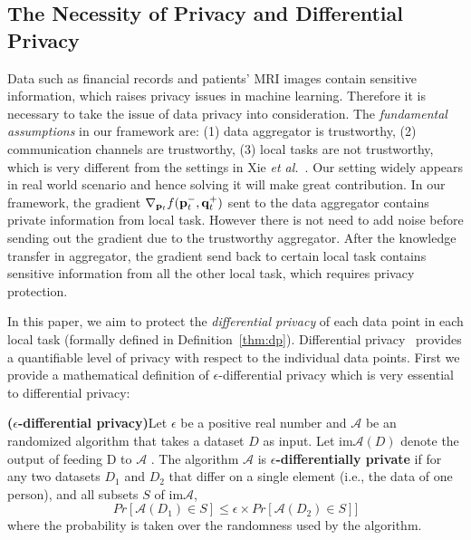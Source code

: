 \subsection{The Necessity of Privacy and Differential Privacy}
\label{Necessity}

Data such as financial records and patients' MRI images contain sensitive information, which raises privacy issues in machine learning. Therefore it is necessary to take the issue of data privacy into consideration. The \textit{fundamental assumptions} in our framework are: (1) data aggregator is trustworthy, (2) communication channels are trustworthy, (3) local tasks are not trustworthy, which is very different from the settings in Xie {\it et al.}~\cite{xie2017privacy}. Our setting widely appears in real world scenario and hence solving it will make great contribution. In our framework, the gradient $\nabla_{\mathbf{p}_t}f(\mathbf{p}_t^-, \mathbf{q}_t^+)$ sent to the data aggregator contains private information from local task. However there is not need to add noise before sending out the gradient due to the trustworthy aggregator. After the knowledge transfer in aggregator, the gradient send back to certain local task contains sensitive information from all the other local task, which requires privacy protection. 

In this paper, we aim to protect the \textit{differential privacy} of
each data point in each local task (formally defined in
Definition~\ref{thm:dp}). Differential privacy~\cite{dwork2006differential}
provides a quantifiable level of privacy with respect to the individual data
points. First we provide a mathematical definition of $\epsilon$-differential privacy which is very essential to differential privacy:

\begin{theorem}
\textbf{($\epsilon$-differential privacy\cite{Dwork:2014:AFD:2693052.2693053})}\indent Let $\epsilon$  be a positive real number and $\mathcal{A}$ be an randomized algorithm that takes a dataset $D$ as input. Let $\displaystyle {\textrm {im}}{\mathcal{A}(D)}$ denote the output of feeding D to $\mathcal{A}$ . The algorithm $\mathcal {A}$ is \textbf{$\epsilon$-differentially private} if for any two datasets $D_{1}$ and $D_{2}$ that differ on a single element (i.e., the data of one person), and all subsets $S$ of $\displaystyle {\textrm {im}}{\mathcal {A}}$,
\[Pr[\mathcal{A}(D_1)\in S]\leq \epsilon \times Pr[\mathcal{A}(D_2)\in S]]\]
where the probability is taken over the randomness used by the algorithm.
\label{thm:dp}
\end{theorem}


